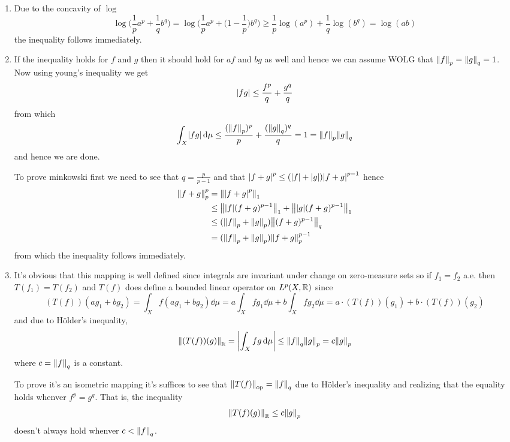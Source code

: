\documentclass{article}
\begin{document}
\begin{homeworkProblem}
    \begin{enumerate}[label=\alph*.]
        \item Due to the concavity of $\log$
        \[\log\bigg(\frac{1}{p}a^p+\frac{1}{q}b^q\bigg)=\log\bigg(\frac{1}{p}a^p+\bigg(1-\frac{1}{p}\bigg)b^q\bigg) \geq \frac{1}{p}\log(a^p)+\frac{1}{q}\log(b^q) = \log(ab)\]
        the inequality follows immediately.
        \item If the inequality holds for $f$ and $g$ then it should hold for $af$ and $bg$ as well and hence we can assume WOLG that $\norm{f}_p=\norm{g}_q=1$. Now using young's inequality we get
        \[\abs{fg} \leq \frac{f^p}{q} + \frac{g^q}{q}\]
        from which
        \[\int_X \abs{fg} \dd\mu \leq \frac{(\norm{f}_p)^p}{p} + \frac{(\norm{g}_q)^q}{q} = 1 = \norm{f}_p\norm{g}_q\]
        and hence we are done.

        To prove minkowski first we need to see that $q = \frac{p}{p-1}$ and that $\abs{f+g}^p\leq(\abs{f}+\abs{g})\abs{f+g}^{p-1}$ hence
        \begin{align*}
            \norm{f+g}_p^p &= \norm{\abs{f+g}^p}_1 \\
            &\leq \norm{\abs{f}(f+g)^{p-1}}_1+\norm{\abs{g}(f+g)^{p-1}}_1 \\
            &\leq (\norm{f}_p+\norm{g}_p)\norm{(f+g)^{p-1}}_q \\
            &= (\norm{f}_p+\norm{g}_p)\norm{f+g}_p^{p-1}
        \end{align*}
        from which the inequality follows immediately.
        \item It's obvious that this mapping is well defined since integrals are invariant under change on zero-measure sets so if $f_1=f_2$ a.e. then $T(f_1)=T(f_2)$ and $T(f)$ does define a bounded linear operator on $L^p(X, \mathbb{R})$ since
        \[(T(f))(ag_1+bg_2) = \int_X f(ag_1+bg_2)\dd\mu = a\int_X fg_1\dd\mu + b\int_X fg_2\dd\mu = a\cdot(T(f))(g_1)+b\cdot(T(f))(g_2)\]
        and due to Hölder's inequality,
        \[\norm{(T(f))(g)}_\bR = \abs{\int_X fg\dd\mu} \leq \norm{f}_q\norm{g}_p = c\norm{g}_p\]
        where $c=\norm{f}_q$ is a constant.
        
        To prove it's an isometric mapping it's suffices to see that $\norm{T(f)}_{\operatorname{op}}=\norm{f}_q$ due to Hölder's inequality and realizing that the equality holds whenver $f^p=g^q$. That is, the inequality
        \[\norm{T(f)(g)}_\bR\leq c\norm{g}_p\]
        doesn't always hold whenver $c<\norm{f}_q$. 
        

\end{enumerate}
\end{homeworkProblem}
\end{document}

